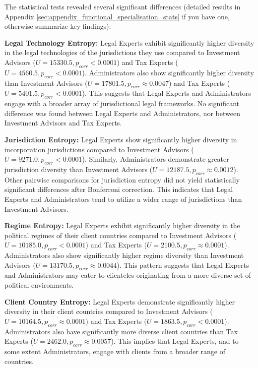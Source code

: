 The statistical tests revealed several significant differences (detailed results in Appendix \ref{sec:appendix_functional_specialisation_stats} if you have one, otherwise summarize key findings):

\textbf{Legal Technology Entropy:}
Legal Experts exhibit significantly higher diversity in the legal technologies of the jurisdictions they use compared to Investment Advisors ($U = 15330.5, p_{corr} < 0.0001$) and Tax Experts ($U = 4560.5, p_{corr} < 0.0001$). Administrators also show significantly higher diversity than Investment Advisors ($U = 17801.5, p_{corr} \approx 0.0047$) and Tax Experts ($U = 5401.5, p_{corr} < 0.0001$). This suggests that Legal Experts and Administrators engage with a broader array of jurisdictional legal frameworks. No significant difference was found between Legal Experts and Administrators, nor between Investment Advisors and Tax Experts.

\textbf{Jurisdiction Entropy:}
Legal Experts show significantly higher diversity in incorporation jurisdictions compared to Investment Advisors ($U = 9271.0, p_{corr} < 0.0001$). Similarly, Administrators demonstrate greater jurisdiction diversity than Investment Advisors ($U = 12187.5, p_{corr} \approx 0.0012$). Other pairwise comparisons for jurisdiction entropy did not yield statistically significant differences after Bonferroni correction. This indicates that Legal Experts and Administrators tend to utilize a wider range of jurisdictions than Investment Advisors.

\textbf{Regime Entropy:}
Legal Experts exhibit significantly higher diversity in the political regimes of their client countries compared to Investment Advisors ($U = 10185.0, p_{corr} < 0.0001$) and Tax Experts ($U = 2100.5, p_{corr} \approx 0.0001$). Administrators also show significantly higher regime diversity than Investment Advisors ($U = 13170.5, p_{corr} \approx 0.0044$). This pattern suggests that Legal Experts and Administrators may cater to clienteles originating from a more diverse set of political environments.

\textbf{Client Country Entropy:}
Legal Experts demonstrate significantly higher diversity in their client countries compared to Investment Advisors ($U = 10164.5, p_{corr} \approx 0.0001$) and Tax Experts ($U = 1863.5, p_{corr} < 0.0001$). Administrators also have significantly more diverse client countries than Tax Experts ($U = 2462.0, p_{corr} \approx 0.0057$). This implies that Legal Experts, and to some extent Administrators, engage with clients from a broader range of countries.

